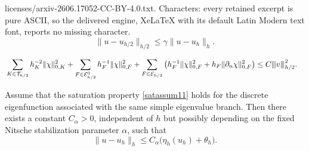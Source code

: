 \documentclass[10pt,a4paper]{amsart}
\newcommand{\vertiii}[1]{{\left\vert\kern-0.25ex\left\vert\kern-0.25ex\left\vert #1 
		\right\vert\kern-0.25ex\right\vert\kern-0.25ex\right\vert}}
\begin{document}
licenses/arxiv-2606.17052-CC-BY-4.0.txt. Characters: every retained excerpt is pure ASCII, so the delivered engine, XeLaTeX with its default Latin Modern text font, reports no missing character.
\begin{equation}\label{satassum11}
   \|u-u_{h/2}\|_{h/2}\le \gamma\|u-u_h\|_{h}.
\end{equation}

\begin{align}
&\sum_{K\in\mathcal T_{h/2}}h_K^{-2}\|\chi\|_{0,K}^2 + \sum_{F\in\mathcal E_{h/2}^0}h_F^{-1}\|\chi\|_{0,F}^2 +
\sum_{F\in\mathcal E_{h/2}} \left(h_F^{-1}\|\chi\|_{0,F}^2 + h_F\|\partial_n \chi\|_{0,F}^2 \right)\leq C \vertiii{v}_{h/2}^2.
\label{eq:lagrange-two-xi-level}
\end{align}

\begin{theorem}[Reliability]
Assume that the saturation property \eqref{satassum11} holds for the discrete
eigenfunction associated with the same simple eigenvalue branch. Then there exists a
constant $C_\alpha>0$, independent of $h$ but possibly depending on the fixed Nitsche
stabilization parameter $\alpha$, such that
\[
   \|u-u_h\|_h \leq C_\alpha\big(\eta_h(u_h)+\theta_h\big).
\]
\end{theorem}
\end{document}
